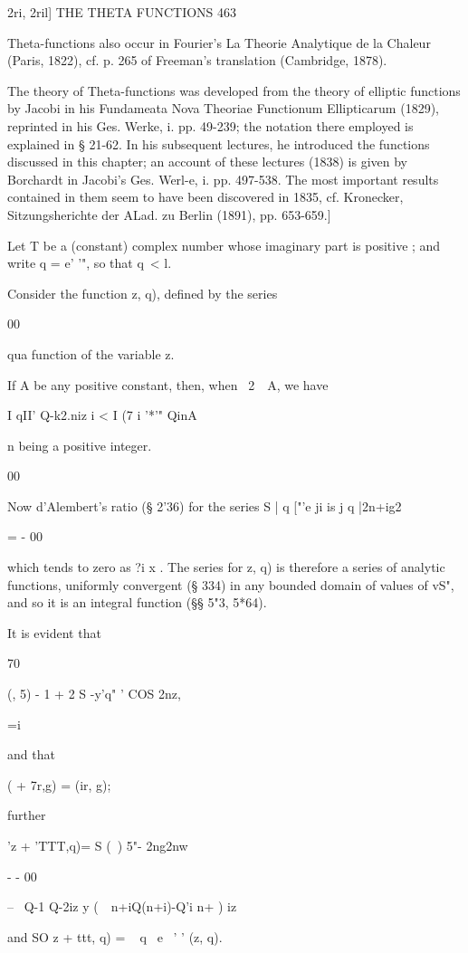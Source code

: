 2ri, 2ril] THE THETA FUNCTIONS 463

Theta-functions also occur in Fourier's La Theorie Analytique de la
Chaleur (Paris, 1822), cf. p. 265 of Freeman's translation (Cambridge,
1878).

The theory of Theta-functions was developed from the theory of
elliptic functions by Jacobi in his Fundameata Nova Theoriae
Functionum Ellipticarum (1829), reprinted in his Ges. Werke, i. pp.
49-239; the notation there employed is explained in § 21-62. In his
subsequent lectures, he introduced the functions discussed in this
chapter; an account of these lectures (1838) is given by Borchardt in
Jacobi's Ges. Werl-e, i. pp. 497-538. The most important results
contained in them seem to have been discovered in 1835, cf. Kronecker,
Sitzungsherichte der ALad. zu Berlin (1891), pp. 653-659.]

Let T be a (constant) complex number whose imaginary part is positive
; and write q = e' '", so that q\ < l.

Consider the function z, q), defined by the series

00

qua function of the variable z.

If A be any positive constant, then, when \ 2\ \ A, we have

I qII' Q-k2.niz i < I (7 i '*'" QinA

n being a positive integer.

00

Now d'Alembert's ratio (§ 2'36) for the series S | q ["'e ji is j q
|2n+ig2

  = - 00

which tends to zero as ?i x . The series for z, q) is therefore a
series of analytic functions, uniformly convergent (§ 334) in any
bounded domain of values of vS", and so it is an integral function (§§
5"3, 5*64).

It is evident that

 70

  (, 5) - 1 + 2 S -y'q" ' COS 2nz,

 =i

and that

 ( + 7r,g) = (ir, g);

further

'z + 'TTT,q)= S (\ ) 5"- 2ng2nw

 - - 00

-- \ Q-1 Q-2iz y (\ \ n+iQ(n+i)-Q'i n+ ) iz

and SO z + ttt, q) = ~ q~ e~ ' ' (z, q).

